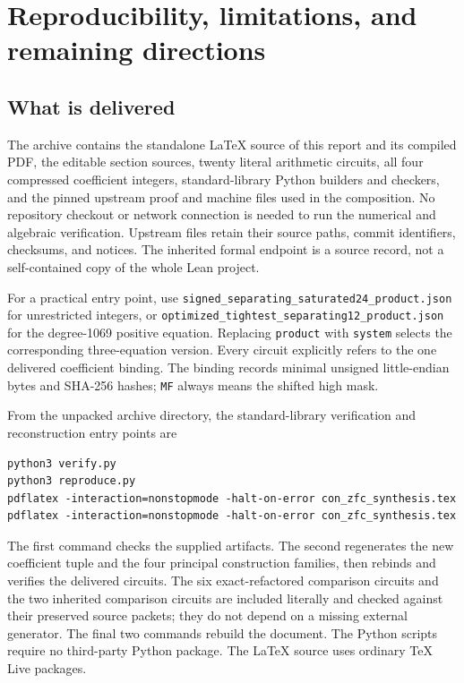 \section{Reproducibility, limitations, and remaining directions}
\label{sec:reproduction}

\subsection{What is delivered}

The archive contains the standalone \LaTeX{} source of this report and its
compiled PDF, the editable section sources, twenty literal arithmetic
circuits, all four compressed coefficient integers, standard-library
Python builders and checkers, and the pinned upstream proof and machine
files used in the composition.  No repository checkout or network
connection is needed to run the numerical and algebraic verification.
Upstream files retain their source paths, commit identifiers, checksums,
and notices.  The inherited formal endpoint is a source record, not a
self-contained copy of the whole Lean project.

For a practical entry point, use
\texttt{signed\_separating\_saturated24\_product.json} for unrestricted
integers, or
\texttt{optimized\_tightest\_separating12\_product.json} for the
degree-1069 positive equation.  Replacing \texttt{product} with
\texttt{system} selects the corresponding three-equation version.  Every
circuit explicitly refers to the one delivered coefficient binding.  The
binding records minimal unsigned little-endian bytes and SHA-256 hashes;
\texttt{MF} always means the shifted high mask.

From the unpacked archive directory, the standard-library verification
and reconstruction entry points are
\begin{verbatim}
python3 verify.py
python3 reproduce.py
pdflatex -interaction=nonstopmode -halt-on-error con_zfc_synthesis.tex
pdflatex -interaction=nonstopmode -halt-on-error con_zfc_synthesis.tex
\end{verbatim}
The first command checks the supplied artifacts.  The second regenerates
the new coefficient tuple and the four principal construction families,
then rebinds and verifies the delivered circuits.  The six exact-refactored
comparison circuits and the two inherited comparison circuits are included
literally and checked against their preserved source packets; they do not
depend on a missing external generator.  The final two commands rebuild
the document.  The Python scripts require no third-party Python package.
The \LaTeX{} source uses ordinary TeX Live packages.

